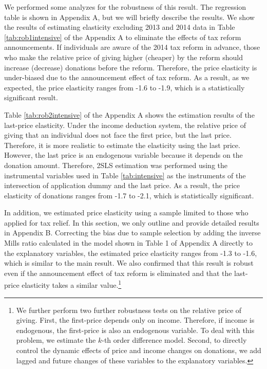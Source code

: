 \documentclass[
  11pt,
  a4paper,
]{article}
\begin{document}
We performed some analyzes for the robustness of this result.
The regression table is shown in Appendix A,
but we will briefly describe the results.
We show the results of estimating elasticity excluding 2013 and 2014 data
in Table \ref{tab:rob1intensive} of the Appendix A
to eliminate the effects of tax reform announcements.
If individuals are aware of the 2014 tax reform in advance,
those who make the relative price of giving higher (cheaper)
by the reform should increase (decrease) donations before the reform.
Therefore, the price elasticity is under-biased
due to the announcement effect of tax reform.
As a result, as we expected,
the price elasticity ranges from -1.6 to -1.9,
which is a statistically significant result.

Table \ref{tab:rob2intensive} of the Appendix A shows
the estimation results of the last-price elasticity.
Under the income deduction system,
the relative price of giving that an individual
does not face the first price, but the last price.
Therefore, it is more realistic to estimate the elasticity
using the last price.
However, the last price is an endogenous variable
because it depends on the donation amount.
Therefore, 2SLS estimation was performed using the instrumental variables
used in Table \ref{tab:intensive} as the instruments of
the intersection of application dummy and the last price.
As a result, the price elasticity of donations ranges from -1.7 to -2.1,
which is statistically significant.

In addition,
we estimated price elasticity
using a sample limited to those who applied for tax relief.
In this section, we only outline and provide detailed results in Appendix B.
Correcting the bias due to sample selection by
adding the inverse Mills ratio calculated in the model
shown in Table 1 of Appendix A directly to the explanatory variables,
the estimated price elasticity ranges from -1.3 to -1.6,
which is similar to the main result.
We also confirmed that
this result is robust
even if the announcement effect of tax reform is eliminated
and that the last-price elasticity takes a similar value.\footnote{We further perform two further robustness tests on the relative price of giving. First, the first-price depends only on income. Therefore, if income is endogenous, the first-price is also an endogenous variable. To deal with this problem, we estimate the \(k\)-th order difference model. Second, to directly control the dynamic effects of price and income changes on donations, we add lagged and future changes of these variables to the explanatory variables.}
\end{document}
